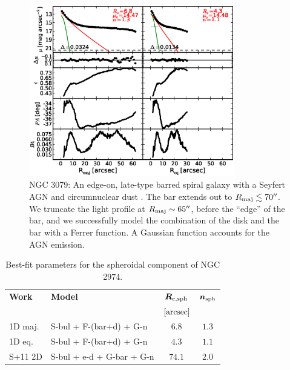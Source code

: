 \documentclass[preprint2]{emulateapj}
\newcommand{\fitfigurewidth}{0.8\textwidth}
\begin{document}
  \begin{figure}[h]
  \begin{center}
  \includegraphics[width=\fitfigurewidth]{n3079_1Dfit.eps}
  \caption{NGC 3079:
  An edge-on, late-type barred spiral galaxy 
  with a Seyfert AGN \citep{veroncettyveron2006} and circumnuclear dust \citep{martini2003}. 
  The bar extends out to $R_{\rm maj} \lesssim 70''$. 
  We truncate the light profile at $R_{\rm maj} \sim 65''$, before the ``edge'' of the bar, 
  and we successfully model the combination of the disk and the bar with a Ferrer function. 
  A Gaussian function accounts for the AGN emission. 
  }
  \end{center}
  \end{figure}
  
  \begin{table}[h]
  \small
  \caption{Best-fit parameters for the spheroidal component of NGC 2974.}
  \begin{center}
  \begin{tabular}{llcc}
  \hline
  {\bf Work} & {\bf Model}   & $\bm R_{\rm e,sph}$    & $\bm n_{\rm sph}$ \\
    &  &  $[\rm arcsec]$ & \\
  \hline
  1D maj. & S-bul + F-(bar+d) + G-n  & $6.8$  &  $1.3$ \\
  1D eq.  & S-bul + F-(bar+d) + G-n  & $4.3$  &  $1.1$ \\
  \hline
  S+11 2D         & S-bul + e-d + G-bar + G-n & $74.1$  &  $2.0$ \\
  \hline
  \end{tabular}
  \end{center}
  \label{tab:n2974}
  \end{table}
\end{document}
